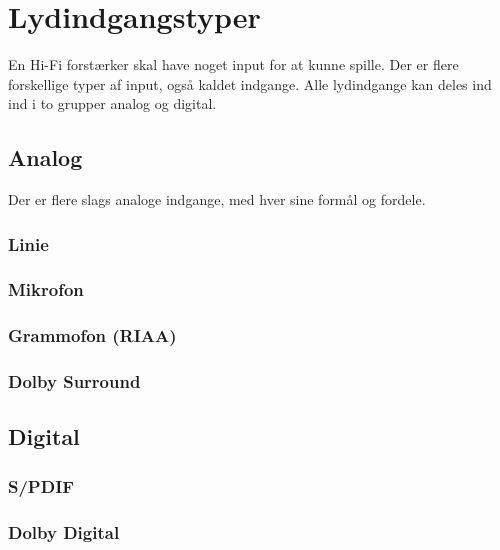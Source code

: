 \section{Lydindgangstyper}
\label{indgange}
En Hi-Fi forstærker skal have noget input for at kunne spille. Der er flere forskellige typer af input, også kaldet indgange. Alle lydindgange kan deles ind ind i to grupper analog og digital.

\subsection{Analog}
Der er flere slags analoge indgange, med hver sine formål og fordele.

\subsubsection{Linie}

\subsubsection{Mikrofon}
\subsubsection{Grammofon (RIAA)}
\subsubsection{Dolby Surround}

\subsection{Digital}
\subsubsection{S/PDIF}
\subsubsection{Dolby Digital}
